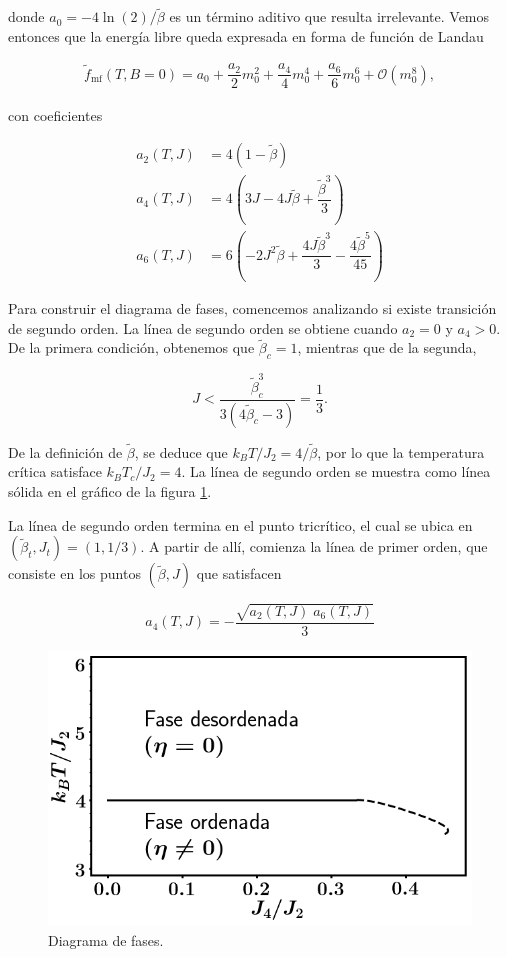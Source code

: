 \documentclass[10pt]{article}
\begin{document}
donde $a_0 = -4\ln(2)/\tilde{\beta}$ es un t\'ermino aditivo que resulta irrelevante. Vemos entonces que la energ\'ia libre queda expresada en forma de funci\'on de Landau

\begin{align}
\tilde{f}_{\mathrm{mf}}(T,B=0) = a_0 + \dfrac{a_2}{2} m_0^2 + 
\dfrac{a_4}{4} m_0^4 + \dfrac{a_6}{6} m_0^6 + \mathcal{O}(m_0^8),
\end{align}

con coeficientes 

\begin{align*}
a_2(T,J) &= 4 (1-\tilde{\beta})\\
a_4(T,J) &= 4\left( 3J - 4J\tilde{\beta} + \dfrac{\tilde{\beta}^3}{3} \right) \\
a_6(T,J) &= 6 \left(-2 J^2\tilde{\beta} + \dfrac{4J\tilde{\beta}^3}{3} - \dfrac{4\tilde{\beta}^5}{45}\right)
\end{align*}

Para construir el diagrama de fases, comencemos analizando si existe transici\'on de segundo orden. La l\'inea de segundo orden se obtiene cuando $a_2=0$ y $a_4>0$. De la primera condici\'on, obtenemos que $\tilde{\beta}_c = 1$, mientras que de la segunda,


\begin{equation}
J < \dfrac{\tilde{\beta}_c^3}{3(4\tilde{\beta}_c-3)}=\dfrac{1}{3}.
\end{equation}

De la definici\'on de $\tilde{\beta}$, se deduce que $k_B T/J_2 = 4 /\tilde{\beta}$, por lo que la temperatura cr\'itica satisface $k_B T_c/J_2 = 4$. La l\'inea de segundo orden se muestra como l\'inea s\'olida en el gr\'afico de la figura \ref{fig:fases}.

La l\'inea de segundo orden termina en el punto tricr\'itico, el cual se ubica en $(\tilde{\beta}_t, J_t)=(1, 1/3)$. A partir de all\'i, comienza la l\'inea de primer orden, que consiste en los puntos $(\tilde{\beta}, J)$ que satisfacen 

\begin{equation}
a_4(T, J)=-\dfrac{\sqrt{a_2(T,J)\;a_6(T,J)}}{3}
\end{equation}

\begin{figure}
\centering
\includegraphics[scale=0.5]{phase_diagram.png}
\caption{\label{fig:fases} Diagrama de fases.}
\end{figure}
\end{document}
